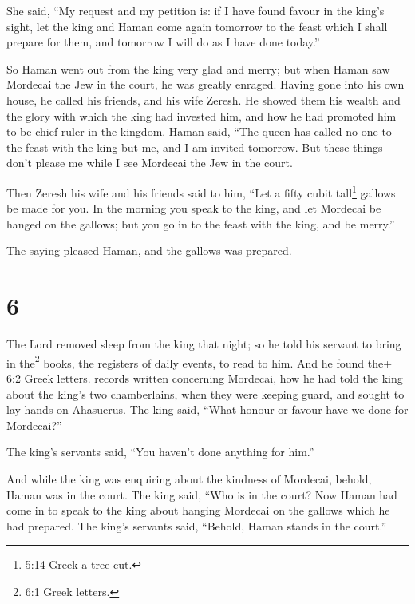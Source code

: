  She said, ``My request and my petition is:  if
I have found favour in the king's sight, let the king and Haman come
again tomorrow to the feast which I shall prepare for them, and tomorrow
I will do as I have done today.''

 So Haman went out from the king very glad and merry; but
when Haman saw Mordecai the Jew in the court, he was greatly enraged.
 Having gone into his own house, he called his friends, and
his wife Zeresh.  He showed them his wealth and the glory
with which the king had invested him, and how he had promoted him to be
chief ruler in the kingdom.  Haman said, ``The queen has
called no one to the feast with the king but me, and I am invited
tomorrow.  But these things don't please me while I see
Mordecai the Jew in the court.

 Then Zeresh his wife and his friends said to him, ``Let a
fifty cubit tall\footnote{5:14 Greek a tree cut.} gallows be made for
you. In the morning you speak to the king, and let Mordecai be hanged on
the gallows; but you go in to the feast with the king, and be merry.''

The saying pleased Haman, and the gallows was prepared.

\hypertarget{section-5}{%
\section{6}\label{section-5}}

 The Lord removed sleep from the king that night; so he told
his servant to bring in the\footnote{6:1 Greek letters.} books, the
registers of daily events, to read to him.  And he found
the+ 6:2 Greek letters. records written concerning Mordecai, how he had
told the king about the king's two chamberlains, when they were keeping
guard, and sought to lay hands on Ahasuerus.  The king said,
``What honour or favour have we done for Mordecai?''

The king's servants said, ``You haven't done anything for him.''

 And while the king was enquiring about the kindness of
Mordecai, behold, Haman was in the court. The king said, ``Who is in the
court? Now Haman had come in to speak to the king about hanging Mordecai
on the gallows which he had prepared.  The king's servants
said, ``Behold, Haman stands in the court.''

